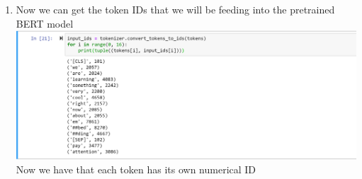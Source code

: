 \documentclass{article}
\begin{document}
\begin{enumerate}
    \item Now we can get the token IDs that we will be feeding into the pretrained BERT model\\
    \includegraphics[scale = .7]{ids1.png}
    \vspace{.1cm}\\
    Now we have that each token has its own numerical ID
    

\end{enumerate}
\end{document}
